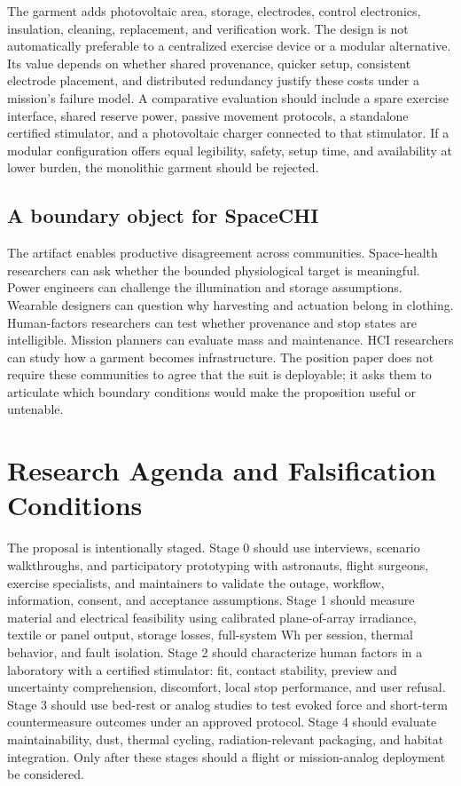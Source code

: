 \documentclass[runningheads]{llncs}
\begin{document}
The garment adds photovoltaic area, storage, electrodes, control electronics, insulation, cleaning, replacement, and verification work. The design is not automatically preferable to a centralized exercise device or a modular alternative. Its value depends on whether shared provenance, quicker setup, consistent electrode placement, and distributed redundancy justify these costs under a mission's failure model. A comparative evaluation should include a spare exercise interface, shared reserve power, passive movement protocols, a standalone certified stimulator, and a photovoltaic charger connected to that stimulator. If a modular configuration offers equal legibility, safety, setup time, and availability at lower burden, the monolithic garment should be rejected.

\subsection{A boundary object for SpaceCHI}

The artifact enables productive disagreement across communities. Space-health researchers can ask whether the bounded physiological target is meaningful. Power engineers can challenge the illumination and storage assumptions. Wearable designers can question why harvesting and actuation belong in clothing. Human-factors researchers can test whether provenance and stop states are intelligible. Mission planners can evaluate mass and maintenance. HCI researchers can study how a garment becomes infrastructure. The position paper does not require these communities to agree that the suit is deployable; it asks them to articulate which boundary conditions would make the proposition useful or untenable.

\section{Research Agenda and Falsification Conditions}

The proposal is intentionally staged. Stage 0 should use interviews, scenario walkthroughs, and participatory prototyping with astronauts, flight surgeons, exercise specialists, and maintainers to validate the outage, workflow, information, consent, and acceptance assumptions. Stage 1 should measure material and electrical feasibility using calibrated plane-of-array irradiance, textile or panel output, storage losses, full-system Wh per session, thermal behavior, and fault isolation. Stage 2 should characterize human factors in a laboratory with a certified stimulator: fit, contact stability, preview and uncertainty comprehension, discomfort, local stop performance, and user refusal. Stage 3 should use bed-rest or analog studies to test evoked force and short-term countermeasure outcomes under an approved protocol. Stage 4 should evaluate maintainability, dust, thermal cycling, radiation-relevant packaging, and habitat integration. Only after these stages should a flight or mission-analog deployment be considered.
\end{document}
